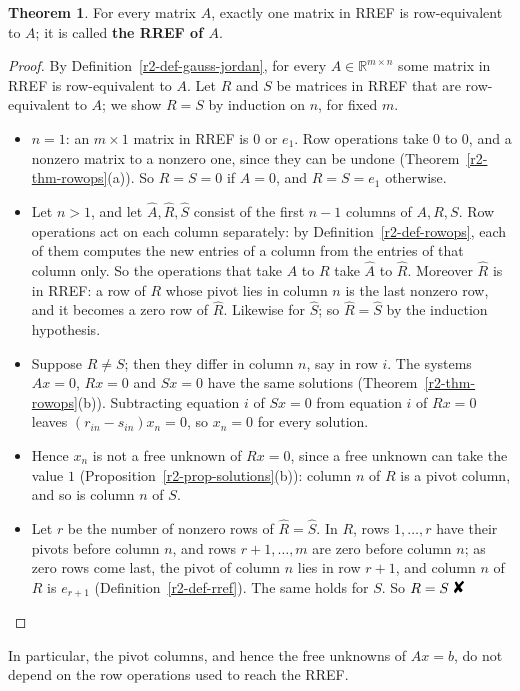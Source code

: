 \documentclass[12pt]{article}
\newcommand{\R}{\mathbb R}
\newcommand{\contradiction}{\mathord{\text{\large\ding{56}}}}
\theoremstyle{definition}
\newtheorem{theorem}{Theorem}
\begin{document}
\begin{theorem}\label{r2-thm-rref-unique}
For every matrix \(A\), exactly one matrix in RREF is row-equivalent to \(A\); it is called \textbf{the RREF of
\(A\)}.
\end{theorem}
\begin{proof}
By Definition~\ref{r2-def-gauss-jordan}, for every \(A\in\R^{m\times n}\) some matrix in RREF is row-equivalent to
\(A\). Let \(R\) and \(S\) be matrices in RREF that are row-equivalent to \(A\); we show \(R=S\) by induction on
\(n\), for fixed \(m\).
\begin{itemize}
\item \(n=1\): an \(m\times1\) matrix in RREF is \(0\) or \(e_1\). Row operations take \(0\) to \(0\), and a nonzero
matrix to a nonzero one, since they can be undone (Theorem~\ref{r2-thm-rowops}(a)). So \(R=S=0\) if \(A=0\), and
\(R=S=e_1\) otherwise.
\item Let \(n>1\), and let \(\hat A,\hat R,\hat S\) consist of the first \(n-1\) columns of \(A,R,S\). Row
operations act on each column separately: by Definition~\ref{r2-def-rowops}, each of them computes the new entries
of a column from the entries of that column only. So the operations that take \(A\) to \(R\) take \(\hat A\) to
\(\hat R\). Moreover \(\hat R\) is in RREF: a row of \(R\)
whose pivot lies in column \(n\) is the last nonzero row, and it becomes a zero row of \(\hat R\). Likewise for
\(\hat S\); so \(\hat R=\hat S\) by the induction hypothesis.
\item Suppose \(R\ne S\); then they differ in column \(n\), say in row \(i\). The systems \(Ax=0\), \(Rx=0\) and
\(Sx=0\) have the same solutions (Theorem~\ref{r2-thm-rowops}(b)). Subtracting equation \(i\) of \(Sx=0\) from
equation \(i\) of \(Rx=0\) leaves \((r_{in}-s_{in})x_n=0\), so \(x_n=0\) for every solution.
\item Hence \(x_n\) is not a free unknown of \(Rx=0\), since a free unknown can take the value \(1\)
(Proposition~\ref{r2-prop-solutions}(b)): column \(n\) of \(R\) is a pivot column, and so is column \(n\) of \(S\).
\item Let \(r\) be the number of nonzero rows of \(\hat R=\hat S\). In \(R\), rows \(1,\dots,r\) have their pivots
before column \(n\), and rows \(r+1,\dots,m\) are zero before column \(n\); as zero rows come last, the pivot of
column \(n\) lies in row \(r+1\), and column \(n\) of \(R\) is \(e_{r+1}\) (Definition~\ref{r2-def-rref}). The same
holds for \(S\). So \(R=S\ \contradiction\)\qedhere
\end{itemize}
\end{proof}
In particular, the pivot columns, and hence the free unknowns of \(Ax=b\), do not depend on the row operations used to
reach the RREF.
\end{document}
